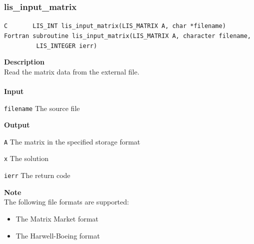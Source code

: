 \documentclass[a4paper]{article}
\newcommand{\namelistlabel}[1]{\mbox{#1}\hfill}
\newenvironment{namelist}[1]{%
\begin{list}{}
  {\let\makelabel\namelistlabel
  \settowidth{\labelwidth}{#1}
  \setlength{\leftmargin}{1.1\labelwidth}}
  }{%
\end{list}}
\begin{document}
\subsubsection{lis\_input\_matrix}
\begin{screen}
\verb|C       LIS_INT lis_input_matrix(LIS_MATRIX A, char *filename)|\\
\verb|Fortran subroutine lis_input_matrix(LIS_MATRIX A, character filename,|\\
\verb|         LIS_INTEGER ierr)|
\end{screen}
{\bf Description}\\
\indent
Read the matrix data from the external file.
\\ \\
\noindent
{\bf Input}
\begin{namelist}{XXXXXXXXXXXXXXXXXXXX}
\item[\tt filename] The source file
\end{namelist}
{\bf Output}
\begin{namelist}{XXXXXXXXXXXXXXXXXXXX}
\item[\tt A] The matrix in the specified storage format
\item[\tt x] The solution
\item[\tt ierr] The return code
\end{namelist}
{\bf Note}\\
\indent
The following file formats are supported:
\begin{itemize}
\item The Matrix Market format
\item The Harwell-Boeing format
\end{itemize}
\end{document}
